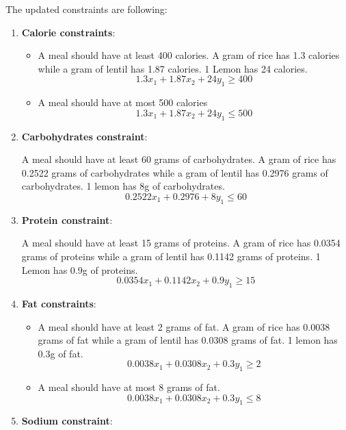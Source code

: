 \documentclass[
]{article}
\begin{document}
The updated constraints are following:
\begin{enumerate}
	\item \textbf{Calorie constraints}: 
	      \begin{itemize}
	      	\item A meal should have at least 400 calories.
	      	      A gram of rice has 1.3 calories while a gram of lentil has 1.87 calories. 1 Lemon has 24 calories.
	      	      \begin{equation}
	      	      	1.3x_1 + 1.87x_2 + 24y_1 \ge 400
	      	      \end{equation}
	      	\item A meal should have at most 500 calories
	      	      \begin{equation}
	      	      	1.3x_1 + 1.87x_2 + 24y_1 \le 500
	      	      \end{equation}
	      \end{itemize}
	\item \textbf{Carbohydrates constraint}:
	      	      
	      A meal should have at least 60 grams of carbohydrates. A gram of rice has 0.2522 grams of carbohydrates while a gram of lentil has 0.2976 grams of carbohydrates.
	      1 lemon has 8g of carbohydrates.
	      \begin{equation}
	      	0.2522x_1 + 0.2976 + 8y_1 \le 60
	      \end{equation}
	\item \textbf{Protein constraint}:
	      	      
	      A meal should have at least 15 grams of proteins. A gram of rice has 0.0354 grams of proteins while a gram of lentil has 0.1142 grams of proteins.
	      1 Lemon has 0.9g of proteins.
	      \begin{equation}
	      	0.0354x_1 + 0.1142x_2 + 0.9y_1 \ge 15
	      \end{equation}
	\item \textbf{Fat constraints}: 
	      \begin{itemize}
	      	\item A meal should have at least 2 grams of fat.
	      	      A gram of rice has 0.0038 grams of fat while a gram of lentil has 0.0308 grams of fat.
	      	      1 lemon has 0.3g of fat.
	      	      \begin{equation}
	      	      	0.0038x_1 + 0.0308x_2 + 0.3y_1 \ge 2
	      	      \end{equation}
	      	\item A meal should have at most 8 grams of fat.
	      	      \begin{equation}
	      	      	0.0038x_1 + 0.0308x_2 + 0.3y_1 \le 8
	      	      \end{equation}
	      \end{itemize}
	\item \textbf{Sodium constraint}:
	      	      

\end{enumerate}
\end{document}
